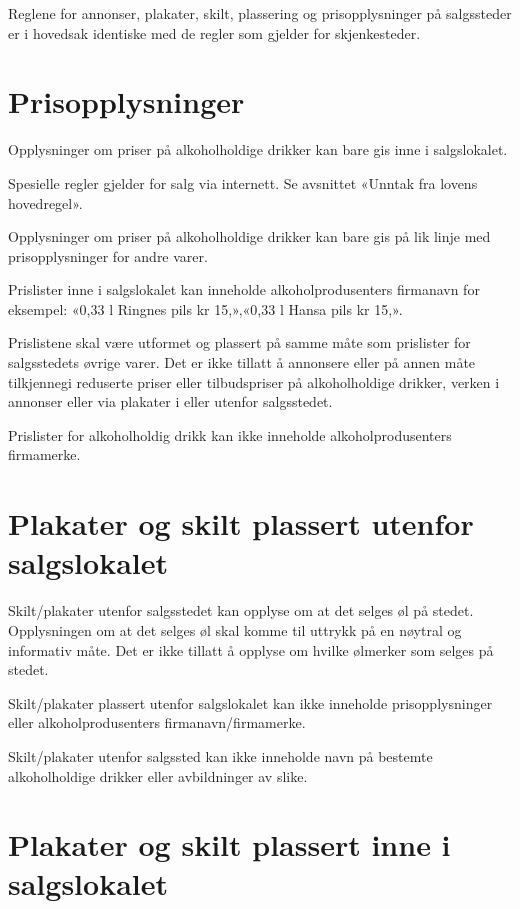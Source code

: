 Reglene for annonser, plakater, skilt, plassering og prisopplysninger på salgssteder er i hovedsak identiske med de regler som gjelder for skjenkesteder.

\section{Prisopplysninger}

Opplysninger om priser på alkoholholdige drikker kan bare gis inne i salgslokalet.

Spesielle regler gjelder for salg via internett. Se avsnittet «Unntak fra lovens hovedregel».

Opplysninger om priser på alkoholholdige drikker kan bare gis på lik linje med prisopplysninger for andre varer.

Prislister inne i salgslokalet kan inneholde alkoholprodusenters firmanavn for eksempel: «0,33 l Ringnes pils kr 15,\textendash»,«0,33 l Hansa pils kr 15,\textendash».

Prislistene skal være utformet og plassert på samme måte som prislister for salgsstedets øvrige varer. Det er ikke tillatt å annonsere eller på annen måte tilkjennegi reduserte priser eller tilbudspriser på alkoholholdige drikker, verken i annonser eller via plakater i eller utenfor salgsstedet.

Prislister for alkoholholdig drikk kan ikke inneholde alkoholprodusenters firmamerke.

\section{Plakater og skilt plassert utenfor salgslokalet}

Skilt/plakater utenfor salgsstedet kan opplyse om at det selges øl på stedet. Opplysningen om at det selges øl skal komme til uttrykk på en nøytral og informativ måte. Det er ikke tillatt å opplyse om hvilke ølmerker som selges på stedet.

Skilt/plakater plassert utenfor salgslokalet kan ikke inneholde prisopplysninger eller alkoholprodusenters firmanavn/firmamerke.

Skilt/plakater utenfor salgssted kan ikke inneholde navn på bestemte alkoholholdige drikker eller avbildninger av slike.

\section{Plakater og skilt plassert inne i salgslokalet}


